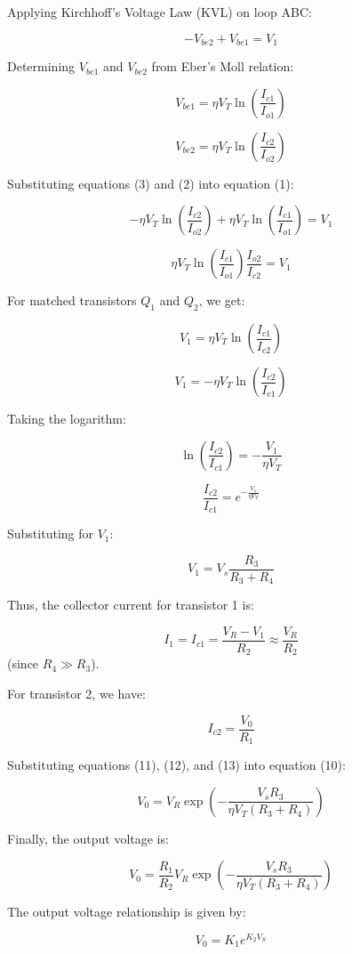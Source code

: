 \documentclass[a4paper,9pt,twoside,openany,twocolumn]{memoir}
\begin{document}
Applying Kirchhoff's Voltage Law (KVL) on loop ABC:

\[
-V_{be2} + V_{be1} = V_1 \tag{1}
\]

Determining \( V_{be1} \) and \( V_{be2} \) from Eber's Moll relation:

\[
V_{be1} = \eta V_T \ln \left( \frac{I_{c1}}{I_{o1}} \right) \tag{2}
\]

\[
V_{be2} = \eta V_T \ln \left( \frac{I_{c2}}{I_{o2}} \right) \tag{3}
\]

Substituting equations (3) and (2) into equation (1):

\[
-\eta V_T \ln \left( \frac{I_{c2}}{I_{o2}} \right) + \eta V_T \ln \left( \frac{I_{c1}}{I_{o1}} \right) = V_1 \tag{4}
\]

\[
\eta V_T \ln \left( \frac{I_{c1}}{I_{o1}} \right) \frac{I_{o2}}{I_{c2}} = V_1 \tag{5}
\]

For matched transistors \( Q_1 \) and \( Q_2 \), we get:

\[
V_1 = \eta V_T \ln \left( \frac{I_{c1}}{I_{c2}} \right) \tag{6}
\]

\[
V_1 = -\eta V_T \ln \left( \frac{I_{c2}}{I_{c1}} \right) \tag{7}
\]

Taking the logarithm:

\[
\ln \left( \frac{I_{c2}}{I_{c1}} \right) = - \frac{V_1}{\eta V_T} \tag{8}
\]

\[
\frac{I_{c2}}{I_{c1}} = e^{-\frac{V_1}{\eta V_T}} \tag{9}
\]

Substituting for \( V_1 \):

\[
V_1 = V_s \frac{R_3}{R_3 + R_4} \tag{11}
\]

Thus, the collector current for transistor 1 is:

\[
I_1 = I_{c1} = \frac{V_R - V_1}{R_2} \approx \frac{V_R}{R_2} \tag{12} 
\]
(since \( R_4 \gg R_3 \)).

For transistor 2, we have:

\[
I_{c2} = \frac{V_0}{R_1} \tag{13}
\]

Substituting equations (11), (12), and (13) into equation (10):

\[
V_0 = V_R \exp \left( -\frac{V_s R_3}{\eta V_T (R_3 + R_4)} \right) \tag{14}
\]

Finally, the output voltage is:

\[
V_0 = \frac{R_1}{R_2} V_R \exp \left( -\frac{V_s R_3}{\eta V_T (R_3 + R_4)} \right) \tag{15}
\]

The output voltage relationship is given by:

\[
V_0 = K_1 e^{K_2 V_S} \tag{16}
\]
\end{document}
